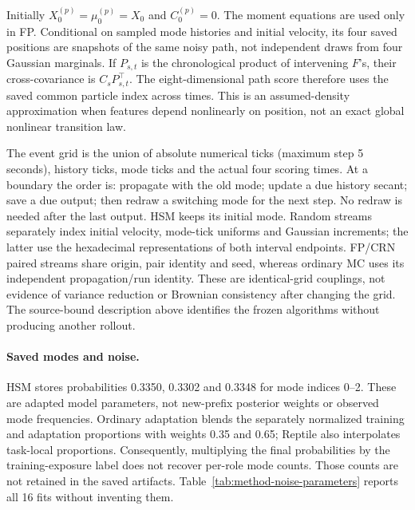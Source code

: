 Initially \(X_0^{(p)}=\mu_0^{(p)}=X_0\) and \(C_0^{(p)}=0\).
The moment equations are used only in FP. Conditional on sampled mode
histories and initial velocity, its four saved positions are snapshots of the
same noisy path, not independent draws from four Gaussian marginals. If
\(P_{s,t}\) is the chronological product of intervening \(F\)'s, their
cross-covariance is \(C_sP_{s,t}^{\top}\). The eight-dimensional path score
therefore uses the saved common particle index across times. This is an
assumed-density approximation when features depend nonlinearly on position,
not an exact global nonlinear transition law.

The event grid is the union of absolute numerical ticks (maximum step
5 seconds), history ticks, mode ticks and the actual four scoring times.
At a boundary the order is: propagate with the old mode; update a due history
secant; save a due output; then redraw a switching mode for the next step.
No redraw is needed after the last output. HSM keeps its initial mode.
Random streams separately index initial velocity, mode-tick uniforms and
Gaussian increments; the latter use the hexadecimal representations of both
interval endpoints. FP/CRN paired streams share origin, pair identity and
seed, whereas ordinary MC uses its independent propagation/run identity.
These are identical-grid couplings, not evidence of variance reduction or
Brownian consistency after changing the grid. The source-bound description
above identifies the frozen algorithms without producing another rollout.

\paragraph{Saved modes and noise.}
HSM stores probabilities 0.3350, 0.3302 and 0.3348 for mode indices
0--2. These are adapted model parameters, not new-prefix posterior weights
or observed mode frequencies. Ordinary adaptation blends the separately
normalized training and adaptation proportions with weights 0.35 and 0.65;
Reptile also interpolates task-local proportions. Consequently, multiplying
the final probabilities by the training-exposure label does not recover
per-role mode counts. Those counts are not retained in the saved artifacts.
Table~\ref{tab:method-noise-parameters} reports all 16 fits without inventing them.

